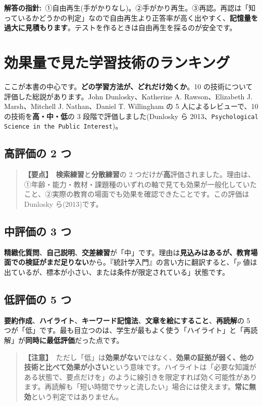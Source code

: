 \documentclass{article}
\begin{document}
\textbf{解答の指針:}\ ①自由再生(手がかりなし)。②手がかり再生。③再認。再認は「知っているかどうかの判定」なので自由再生より正答率が高く出やすく、\textbf{記憶量を過大に見積もります}。テストを作るときは自由再生を採るのが安全です。

\section{効果量で見た学習技術のランキング}

ここが本書の中心です。\textbf{どの学習方法が、どれだけ効くか}。10 の技術について評価した総説があります。John Dunlosky、Katherine A. Rawson、Elizabeth J. Marsh、Mitchell J. Nathan、Daniel T. Willingham の 5 人によるレビューで、10 の技術を\textbf{高・中・低}の 3 段階で評価しました(Dunlosky ら 2013、\texttt{Psychological Science in the Public Interest})。

\subsection{高評価の 2 つ}

\begin{quote}
\textbf{【要点】}\ \textbf{検索練習}と\textbf{分散練習}の 2 つだけが\textbf{高}評価されました。理由は、①年齢・能力・教材・課題種のいずれの軸で見ても効果が一般化していたこと、②実際の教育の場面でも効果を確認できたことです。この評価は Dunlosky ら(2013)です。
\end{quote}

\subsection{中評価の 3 つ}

\textbf{精緻化質問}、\textbf{自己説明}、\textbf{交差練習}が「中」です。理由は\textbf{見込みはあるが、教育場面での検証がまだ足りない}から。『統計学入門』の言い方に翻訳すると、「\(p\) 値は出ているが、標本が小さい、または条件が限定されている」状態です。

\subsection{低評価の 5 つ}

\textbf{要約作成}、\textbf{ハイライト}、\textbf{キーワード記憶法}、\textbf{文章を絵にすること}、\textbf{再読解}の 5 つが「低」です。最も目立つのは、学生が最もよく使う「ハイライト」と「再読解」が\textbf{同時に最低評価}だった点です。

\begin{quote}
\textbf{【注意】}\ ただし「低」は\textbf{効果がない}ではなく、\textbf{効果の証拠が弱く、他の技術と比べて効果が小さい}という意味です。ハイライトは「必要な知識がある状態で、要点だけを」のように線引きを限定すれば効く可能性があります。再読解も「短い時間でサッと流したい」場合には使えます。\textbf{常に無効}という判定ではありません。
\end{quote}
\end{document}
